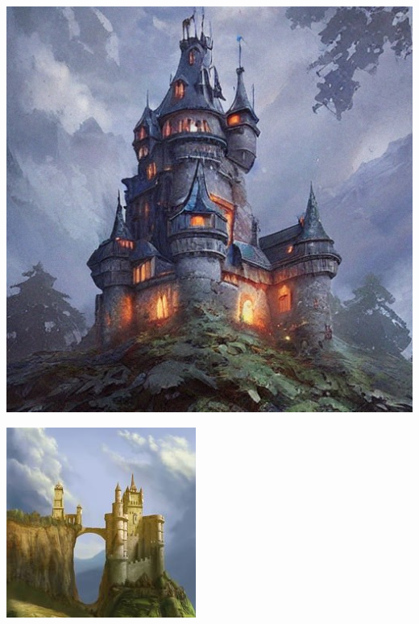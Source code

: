 \documentclass[10pt]{article}
\begin{document}
\begin{center}
\begin{minipage}{0.3\textwidth}
\begin{minipage}{.5\textwidth}
        \label{fig:test2}
    \end{minipage}
  \end{minipage}
  \begin{minipage}{0.3\textwidth}
    \centering
      \begin{minipage}{.5\textwidth}
        \centering
        \includegraphics[width=0.9\linewidth]{castle1.jpg}
        \label{fig:test1}
      \end{minipage}%
      \begin{minipage}{.5\textwidth}
        \centering
        \includegraphics[width=0.9\linewidth]{castle2.jpg}

\end{minipage}
\end{minipage}
\end{center}
\end{document}
